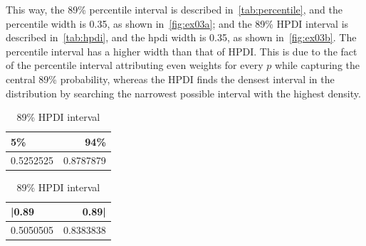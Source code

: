 \documentclass[article]{memoir}
\begin{document}


This way, the 89\% percentile interval is described in~\autoref{tab:percentile}, and the percentile width is 0.35, as shown in~\autoref{fig:ex03a}; and the 89\% HPDI interval is described in~\autoref{tab:hpdi}, and the hpdi width is 0.35, as shown in~\autoref{fig:ex03b}.
The percentile interval has a higher width than that of HPDI\@.
This is due to the fact of the percentile interval attributing even weights for every $p$ while capturing the central 89\% probability, whereas the HPDI finds the densest interval in the distribution by searching the narrowest possible interval with the highest density.

\begin{table}[!ht]
\begin{minipage}[b]{0.42\linewidth}
\centering
\begin{tabular}{lr}
\toprule
5\% & 94\%\\
\midrule
0.5252525 & 0.8787879\\
\bottomrule
\end{tabular}
\caption{89\% percentile interval}\label{tab:percentile}
\end{minipage}
\hspace{0.1\linewidth}
\begin{minipage}[b]{0.42\linewidth}
\centering
\begin{tabular}{lr}
\toprule
|0.89 & 0.89|\\
\midrule
0.5050505 & 0.8383838\\
\bottomrule
\end{tabular}
\caption{89\% HPDI interval}\label{tab:hpdi}
\end{minipage}
\end{table}
\end{document}
